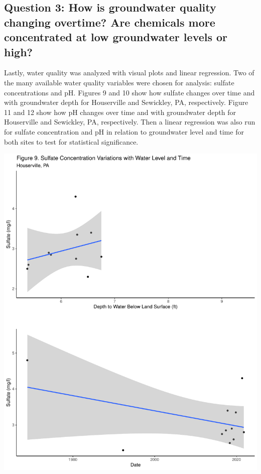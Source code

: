 \documentclass[
  12pt,
]{article}
\begin{document}
\hypertarget{question-3-how-is-groundwater-quality-changing-overtime-are-chemicals-more-concentrated-at-low-groundwater-levels-or-high}{%
\subsection{Question 3: How is groundwater quality changing overtime?
Are chemicals more concentrated at low groundwater levels or
high?}\label{question-3-how-is-groundwater-quality-changing-overtime-are-chemicals-more-concentrated-at-low-groundwater-levels-or-high}}

Lastly, water quality was analyzed with visual plots and linear
regression. Two of the many available water quality variables were
chosen for analysis: sulfate concentrations and pH. Figures 9 and 10
show how sulfate changes over time and with groundwater depth for
Houserville and Sewickley, PA, respectively. Figure 11 and 12 show how
pH changes over time and with groundwater depth for Houserville and
Sewickley, PA, respectively. Then a linear regression was also run for
sulfate concentration and pH in relation to groundwater level and time
for both sites to test for statistical significance.

\includegraphics{Elliott_WDA_Project_files/figure-latex/groundwater_quality-1.pdf}
\end{document}
